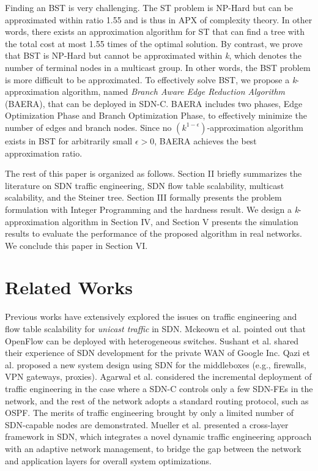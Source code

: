 \documentclass[conference]{IEEEtran}
\begin{document}
Finding an BST is very challenging. The ST problem is NP-Hard but can be
approximated within ratio 1.55 \cite{Robins2000} and is thus in APX of complexity theory. In other words, there exists an approximation algorithm for ST that can find
a tree with the total cost at most 1.55 times of the optimal solution. By
contrast, we prove that BST is NP-Hard but cannot be approximated within
\textit{k}, which denotes the number of terminal nodes in a multicast group. In
other words, the BST problem is more difficult to be approximated. To
effectively solve BST, we propose a \textit{k}-approximation algorithm,
named \textit{Branch Aware Edge Reduction Algorithm} (BAERA), that can be
deployed in SDN-C. BAERA includes
two phases, Edge Optimization Phase and Branch Optimization Phase, to
effectively minimize the number of edges and branch nodes. Since no $(k^{1-\epsilon })$-approximation algorithm exists in BST for arbitrarily
small $\epsilon >0$, BAERA achieves the best approximation ratio.

{The rest of this paper is organized as follows. Section II briefly
summarizes the literature on SDN traffic engineering, SDN flow table
scalability, multicast scalability, and the Steiner tree. Section III formally
presents the problem formulation with Integer Programming and the hardness
result. We design a \textit{k}-approximation algorithm in Section IV, and
Section V presents the simulation results to evaluate the performance of the
proposed algorithm in real networks. We conclude this paper in Section VI.}

\section{Related Works}

Previous works have extensively explored the issues on traffic engineering
and flow table scalability for \textit{unicast traffic} in SDN. Mckeown et al. \cite{McKeown2008} pointed out that OpenFlow can
be deployed with heterogeneous switches. Sushant et al. \cite{Sushant2013} shared their experience of SDN development for the private WAN of Google Inc.
Qazi et al. \cite{Qazi2013} proposed a new system design using SDN for the middleboxes (e.g., firewalls, VPN gateways, proxies).
Agarwal et al. \cite{Agarwal2013} considered the incremental deployment of traffic engineering in the case
where a SDN-C controls only a few SDN-FEs in the network, and the rest of
the network adopts a standard routing protocol, such as OSPF. The merits of
traffic engineering brought by only a limited number of SDN-capable nodes
are demonstrated. Mueller et al. \cite{Mueller2013} presented a cross-layer framework
in SDN, which integrates a novel dynamic traffic engineering approach with
an adaptive network management, to bridge the gap between the network and
application layers for overall system optimizations.
\end{document}
